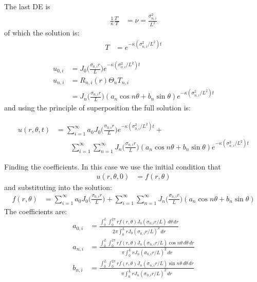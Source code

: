 The last DE is
%
\begin{align*}
\frac{1}{\kappa} \frac{T'}{T} & = \nu = \frac{\sigma_{n,i}^2}{L^2}
\end{align*}
of which the solution is:
%
\begin{align*}
T & = e^{-\kappa (\sigma_{n,i}^2/L^2) t}
\end{align*}


\begin{align*}
u_{0,i} & = J_0\biggl(\frac{\sigma_{0,i} r}{L} \biggr) e^{-\kappa (\sigma_{0,i}^2/L^2) t}  \\
u_{n,i} & = R_{n,i}(r) \Theta_n T_{n,i} \\
& = J_n\biggl(\frac{\sigma_{n,i} r}{L} \biggr) (a_n \cos n \theta + b_n \sin \theta) e^{-\kappa (\sigma_{n,i}^2/L^2) t}
\end{align*}
and using the principle of superposition the full solution is:

%
\begin{align*}
u(r,\theta,t) & = \sum_{i=1}^{\infty} a_0 J_0\biggl(\frac{\sigma_{0,i} r}{L} \biggr) e^{-\kappa (\sigma_{0,i}^2/L^2) t}  + \\
& \qquad \sum_{i=1}^{\infty}  \sum_{n=1}^{\infty} J_n\biggl(\frac{\sigma_{n,i} r}{L} \biggr) ( a_n \cos n \theta + b_n \sin \theta) e^{-\kappa (\sigma_{n,i}^2/L^2) t}
\end{align*}

Finding the coefficients.  In this case we use the initial condition that
%
\begin{align*}
u(r,\theta,0) & = f(r,\theta)
\end{align*}
and substituting into the solution:
%
\begin{align*}
f(r,\theta) & = \sum_{i=1}^{\infty} a_0 J_0\biggl(\frac{\sigma_{0,i} r}{L} \biggr) +
 \sum_{i=1}^{\infty}  \sum_{n=1}^{\infty} J_n\biggl(\frac{\sigma_{n,i} r}{L} \biggr) ( a_n \cos n \theta + b_n \sin \theta)
 \end{align*}
The coefficients are:
%
\begin{align*}
a_{0,i} & = \frac{\int_0^L \int_0^{2\pi} r f(r,\theta) J_0(\sigma_{0,i} r/L) \,d\theta \, dr}
{2\pi \int_0^L  r J_0(\sigma_{0,i} r/L)^2  \, dr}\\
a_{n,i} & = \frac{\int_0^L \int_0^{2\pi} r f(r,\theta) J_n(\sigma_{n,i} r/L)\cos n\theta \,d\theta \, dr}
{\pi \int_0^L  r J_n(\sigma_{0,i} r/L)^2  \, dr} \\
b_{n,i} & = \frac{\int_0^L \int_0^{2\pi} r f(r,\theta) J_n(\sigma_{n,i} r/L)\sin n\theta \,d\theta \, dr}
{\pi \int_0^L  r J_n(\sigma_{0,i} r/L)^2  \, dr}
\end{align*}


